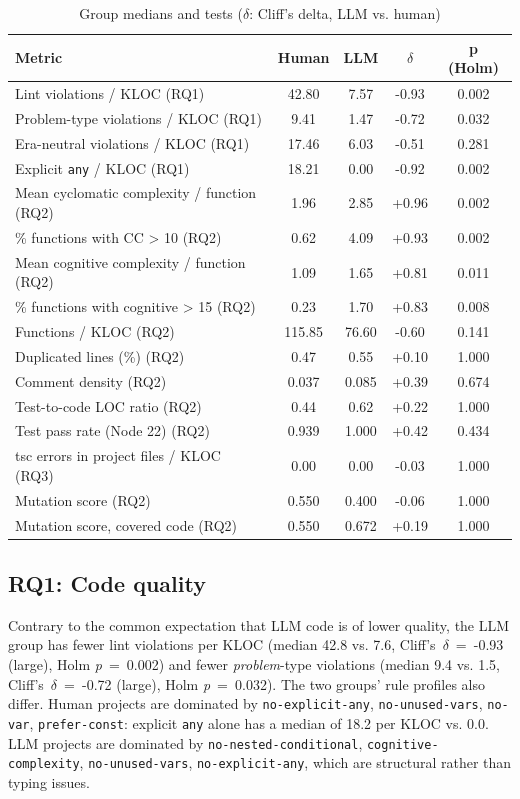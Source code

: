 \documentclass[10pt,conference]{IEEEtran}
\begin{document}
\begin{table}[t]
\caption{Group medians and tests ($\delta$: Cliff's delta, LLM vs. human)}
\label{tab:stats}
\centering
\scriptsize
\setlength{\tabcolsep}{2.5pt}
\begin{tabular}{lcccc}
\toprule
Metric & Human & LLM & $\delta$ & p (Holm) \\
\midrule
Lint violations / KLOC (RQ1) & 42.80 & 7.57 & -0.93 & 0.002 \\
Problem-type violations / KLOC (RQ1) & 9.41 & 1.47 & -0.72 & 0.032 \\
Era-neutral violations / KLOC (RQ1) & 17.46 & 6.03 & -0.51 & 0.281 \\
Explicit \texttt{any} / KLOC (RQ1) & 18.21 & 0.00 & -0.92 & 0.002 \\
Mean cyclomatic complexity / function (RQ2) & 1.96 & 2.85 & +0.96 & 0.002 \\
\% functions with CC \textgreater{} 10 (RQ2) & 0.62 & 4.09 & +0.93 & 0.002 \\
Mean cognitive complexity / function (RQ2) & 1.09 & 1.65 & +0.81 & 0.011 \\
\% functions with cognitive \textgreater{} 15 (RQ2) & 0.23 & 1.70 & +0.83 & 0.008 \\
Functions / KLOC (RQ2) & 115.85 & 76.60 & -0.60 & 0.141 \\
Duplicated lines (\%) (RQ2) & 0.47 & 0.55 & +0.10 & 1.000 \\
Comment density (RQ2) & 0.037 & 0.085 & +0.39 & 0.674 \\
Test-to-code LOC ratio (RQ2) & 0.44 & 0.62 & +0.22 & 1.000 \\
Test pass rate (Node 22) (RQ2) & 0.939 & 1.000 & +0.42 & 0.434 \\
tsc errors in project files / KLOC (RQ3) & 0.00 & 0.00 & -0.03 & 1.000 \\
Mutation score (RQ2) & 0.550 & 0.400 & -0.06 & 1.000 \\
Mutation score, covered code (RQ2) & 0.550 & 0.672 & +0.19 & 1.000 \\
\bottomrule
\end{tabular}
\end{table}

\subsection{RQ1: Code quality}
Contrary to the common expectation that LLM code is of lower quality, the LLM group has fewer lint violations per KLOC (median 42.8 vs. 7.6, Cliff's~$\delta$~=~-0.93 (large), Holm \emph{p}~=~0.002) and fewer \emph{problem}-type violations (median 9.4 vs. 1.5, Cliff's~$\delta$~=~-0.72 (large), Holm \emph{p}~=~0.032). The two groups' rule profiles also differ. Human projects are dominated by \texttt{no-explicit-any}, \texttt{no-unused-vars}, \texttt{no-var}, \texttt{prefer-const}: explicit \texttt{any} alone has a median of 18.2 per KLOC vs. 0.0. LLM projects are dominated by \texttt{no-nested-conditional}, \texttt{cognitive-complexity}, \texttt{no-unused-vars}, \texttt{no-explicit-any}, which are structural rather than typing issues.
\end{document}
